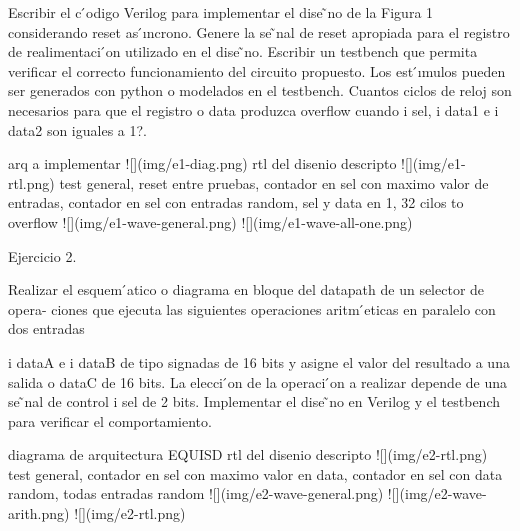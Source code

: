 Escribir el c ́odigo Verilog para implementar el dise ̃no de la Figura 1 considerando reset
as ́ıncrono.
Genere la se ̃nal de reset apropiada para el registro de realimentaci ́on utilizado en el
dise ̃no.
Escribir un testbench que permita verificar el correcto funcionamiento del circuito
propuesto. Los est ́ımulos pueden ser generados con python o modelados en el testbench.
Cuantos ciclos de reloj son necesarios para que el registro o data produzca overflow
cuando i sel, i data1 e i data2 son iguales a 1?.

arq a implementar
![](img/e1-diag.png)
rtl del disenio descripto
![](img/e1-rtl.png)
test general, reset entre pruebas, contador en sel con maximo valor de entradas, contador en sel con entradas random, sel y data en 1, 32 cilos to overflow
![](img/e1-wave-general.png)
![](img/e1-wave-all-one.png)


Ejercicio 2.

Realizar el esquem ́atico o diagrama en bloque del datapath de un selector de opera-
ciones que ejecuta las siguientes operaciones aritm ́eticas en paralelo con dos entradas

i dataA e i dataB de tipo signadas de 16 bits y asigne el valor del resultado a una
salida o dataC de 16 bits.
La elecci ́on de la operaci ́on a realizar depende de una se ̃nal de control i sel de 2 bits.
Implementar el dise ̃no en Verilog y el testbench para verificar el comportamiento.

diagrama de arquitectura
EQUISD
rtl del disenio descripto
![](img/e2-rtl.png)
test general, contador en sel con maximo valor en data, contador en sel con data random, todas entradas random
![](img/e2-wave-general.png)
![](img/e2-wave-arith.png)
![](img/e2-rtl.png)


